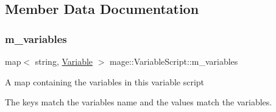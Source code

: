\subsection{Member Data Documentation}
\hypertarget{classmage_1_1_variable_script_a18e5571793e4399e989c533409dd5ac3}{}\label{classmage_1_1_variable_script_a18e5571793e4399e989c533409dd5ac3} 
\subsubsection{\texorpdfstring{m\+\_\+variables}{m\_variables}}
{\footnotesize\ttfamily map$<$ string, \hyperlink{structmage_1_1_variable}{Variable} $>$ mage\+::\+Variable\+Script\+::m\+\_\+variables\hspace{0.3cm}{\ttfamily [private]}}

A map containing the variables in this variable script

The keys match the variables\textquotesingle{} name and the values match the variables. 